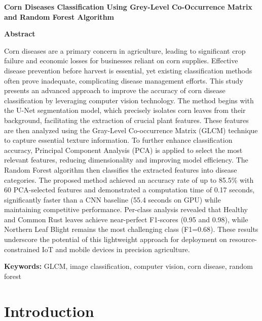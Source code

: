 \documentclass[10pt,a4paper]{article}
\begin{document}
\begin{center}
    {\fontsize{14}{17}\bfseries Corn Diseases Classification Using Grey-Level Co-Occurrence Matrix and Random Forest Algorithm\par}
\end{center}

\vspace{6pt}
\begin{center}
    \textbf{\fontsize{10}{12}\selectfont Abstract}
\end{center}
\noindent Corn diseases are a primary concern in agriculture, leading to significant crop failure and economic losses for businesses reliant on corn supplies. Effective disease prevention before harvest is essential, yet existing classification methods often prove inadequate, complicating disease management efforts. This study presents an advanced approach to improve the accuracy of corn disease classification by leveraging computer vision technology. The method begins with the U-Net segmentation model, which precisely isolates corn leaves from their background, facilitating the extraction of crucial plant features. These features are then analyzed using the Gray-Level Co-occurrence Matrix (GLCM) technique to capture essential texture information. To further enhance classification accuracy, Principal Component Analysis (PCA) is applied to select the most relevant features, reducing dimensionality and improving model efficiency. The Random Forest algorithm then classifies the extracted features into disease categories. The proposed method achieved an accuracy rate of up to 85.5\% with 60 PCA-selected features and demonstrated a computation time of 0.17 seconds, significantly faster than a CNN baseline (55.4 seconds on GPU) while maintaining competitive performance. Per-class analysis revealed that Healthy and Common Rust leaves achieve near-perfect F1-scores (0.95 and 0.98), while Northern Leaf Blight remains the most challenging class (F1=0.68). These results underscore the potential of this lightweight approach for deployment on resource-constrained IoT and mobile devices in precision agriculture.

\vspace{6pt}
\noindent\textbf{Keywords:} GLCM, image classification, computer vision, corn disease, random forest

\section{Introduction}
\end{document}
